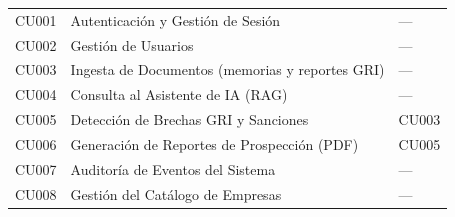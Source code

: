 \begin{center}
\begin{tabular}{|C{2.4cm}|L{9.2cm}|C{2.9cm}|}
\hline
{} &  &  \\
\hline
CU001 & Autenticación y Gestión de Sesión & --- \\
\hline
CU002 & Gestión de Usuarios & --- \\
\hline
CU003 & Ingesta de Documentos (memorias y reportes GRI) & --- \\
\hline
CU004 & Consulta al Asistente de IA (RAG) & --- \\
\hline
CU005 & Detección de Brechas GRI y Sanciones & CU003 \\
\hline
CU006 & Generación de Reportes de Prospección (PDF) & CU005 \\
\hline
CU007 & Auditoría de Eventos del Sistema & --- \\
\hline
CU008 & Gestión del Catálogo de Empresas & --- \\
\hline
\end{tabular}
\end{center}

\newcommand{\frow}[2]{#1 & #2 \\ \hline}
\newcommand{\ficha}[1]{\begin{longtable}{|>{\columncolor{cellgray}\bfseries\RaggedRight\arraybackslash}p{3.3cm}|L{11.9cm}|}\hline #1 \end{longtable}}
\newcommand{\figframe}[2]{\begin{center}\fbox{\begin{minipage}{0.94\textwidth}\centering\vspace{4pt}{\small [ IMAGEN ] #1}\\[6pt]#2\vspace{4pt}\end{minipage}}\end{center}}
\newcommand{\figempty}[1]{\begin{center}\fbox{\begin{minipage}{0.94\textwidth}\centering\vspace{6pt}{\small [ IMAGEN ] #1}\vspace{6pt}\end{minipage}}\end{center}}

\clearpage
